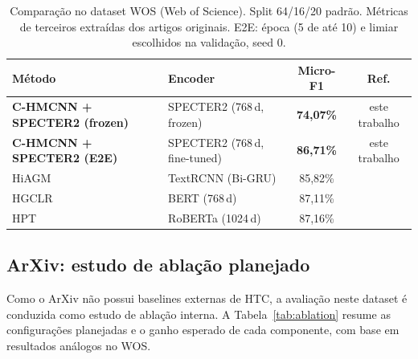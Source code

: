 \documentclass[11pt,a4paper,twoside]{article}
\newcommand{\ours}[1]{\textcolor{ourblue}{\textbf{#1}}}
\begin{document}
\begin{table}[htbp]
\centering
\footnotesize
\setlength{\tabcolsep}{4pt}
\caption{Comparação no dataset WOS (Web of Science). Split 64/16/20 padrão.
         Métricas de terceiros extraídas dos artigos originais.  E2E: época
         (5 de até 10) e limiar escolhidos na validação, seed 0.}
\label{tab:wos_sota}
\begin{tabular}{llcc}
\toprule
\textbf{Método} & \textbf{Encoder} & \textbf{Micro-F1} & \textbf{Ref.} \\
\midrule
\ours{C-HMCNN + SPECTER2 (frozen)} & SPECTER2 (768\,d, frozen)
    & \ours{74,07\%} & este trabalho \\
\ours{C-HMCNN + SPECTER2 (E2E)}   & SPECTER2 (768\,d, fine-tuned)
    & \ours{86,71\%} & este trabalho \\
\midrule
HiAGM                      & TextRCNN (Bi-GRU)
    & 85,82\%   & \cite{zhou2020hiagm} \\
HGCLR                      & BERT (768\,d)
    & 87,11\%   & \cite{wang2022hgclr} \\
HPT                        & RoBERTa (1024\,d)
    & 87,16\%   & \cite{wang2022hpt} \\
\bottomrule
\end{tabular}
\end{table}

\subsection{ArXiv: estudo de ablação planejado}

Como o ArXiv não possui baselines externas de HTC, a avaliação neste dataset é
conduzida como estudo de ablação interna. A Tabela~\ref{tab:ablation}
resume as configurações planejadas e o ganho esperado de cada componente, com
base em resultados análogos no WOS.
\end{document}
